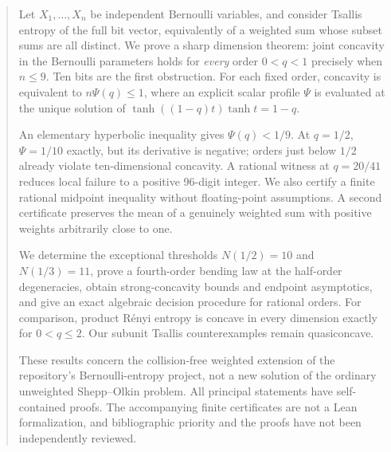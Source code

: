 \documentclass[11pt]{article}
\numberwithin{equation}{section}
\theoremstyle{definition}
\theoremstyle{remark}
\begin{document}
\begin{quote}\small
Let $X_1,\ldots,X_n$ be independent Bernoulli variables, and consider Tsallis
entropy of the full bit vector, equivalently of a weighted sum whose subset
sums are all distinct. We prove a sharp dimension theorem: joint concavity
in the Bernoulli parameters holds for \emph{every} order $0<q<1$ precisely
when $n\leq9$. Ten bits are the first obstruction. For each fixed order,
concavity is equivalent to $n\Psi(q)\leq1$, where an explicit scalar profile
$\Psi$ is evaluated at the unique solution of
$\tanh((1-q)t)\tanh t=1-q$.

An elementary hyperbolic inequality gives $\Psi(q)<1/9$. At $q=1/2$,
$\Psi=1/10$ exactly, but its derivative is negative; orders just below
$1/2$ already violate ten-dimensional concavity. A rational witness at
$q=20/41$ reduces local failure to a positive 96-digit integer. We also
certify a finite rational midpoint inequality without floating-point
assumptions. A second certificate preserves the mean of a genuinely
weighted sum with positive weights arbitrarily close to one.

We determine the exceptional thresholds $N(1/2)=10$ and $N(1/3)=11$,
prove a fourth-order bending law at the half-order degeneracies, obtain
strong-concavity bounds and endpoint asymptotics, and give an exact
algebraic decision procedure for rational orders. For comparison, product
R\'enyi entropy is concave in every dimension exactly for $0<q\leq2$.
Our subunit Tsallis counterexamples remain quasiconcave.

These results concern the collision-free weighted extension of the
repository's Bernoulli-entropy project, not a new solution of the ordinary
unweighted Shepp--Olkin problem. All principal statements have
self-contained proofs. The accompanying finite certificates are not a
Lean formalization, and bibliographic priority and the proofs have not
been independently reviewed.
\end{quote}
\end{document}
